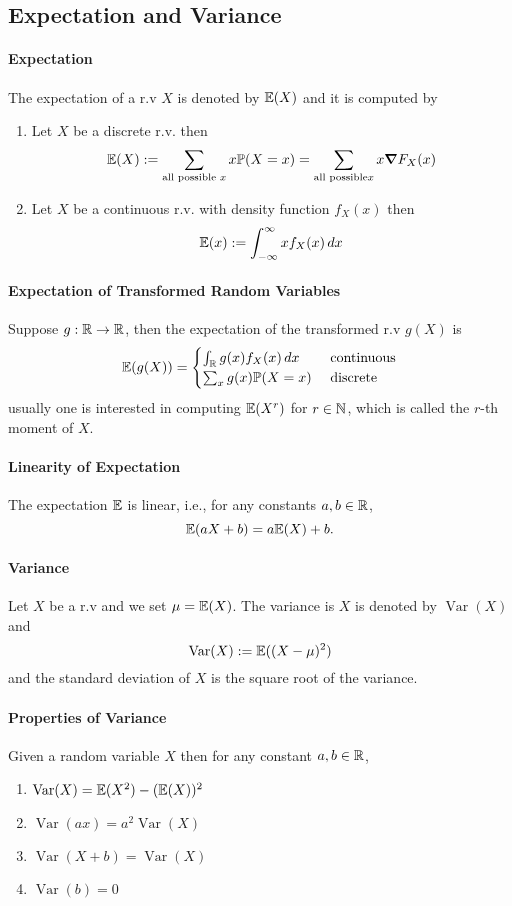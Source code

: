 \subsection{Expectation and Variance}
\paragraph{Expectation}
The expectation of a r.v \(X\) is denoted by \(\mathbb{E}(X)\) and it is computed by 
\begin{enumerate}
    \item Let \(X\) be a discrete r.v. then 
    \[\mathbb{E}(X) := \sum_{\text{all possible } x} x\mathbb{P}(X = x) = \sum_{\text{all possible} x} x\grad F_X(x)\]
    \item Let \(X\) be a continuous r.v. with density function \(f_X(x)\) then
    \[\mathbb{E}(x) := \int_{-\infty}^\infty xf_X(x) \, dx\]
\end{enumerate}

\paragraph{Expectation of Transformed Random Variables}
Suppose \(g: \mathbb{R} \to \mathbb{R}\), then the expectation of the transformed r.v \(g(X)\) is 
\[\mathbb{E}(g(X)) = \begin{cases}
    \int_{\mathbb{R}} g(x)f_X(x) \, dx & \text{ continuous} \\
    \sum_x g(x)\mathbb{P}(X = x) & \text{ discrete}
\end{cases}
\]
usually one is interested in computing \(\mathbb{E}(X^r)\) for \(r \in \mathbb{N}\), which is called the \(r\)-th moment of \(X\).

\paragraph{Linearity of Expectation}
The expectation \(\mathbb{E}\) is linear, i.e., for any constants \(a,b \in \mathbb{R}\),
\[\mathbb{E}(aX + b) = a\mathbb{E}(X) + b.\]

\paragraph{Variance}
Let \(X\) be a r.v and we set \(\mu = \mathbb{E}(X)\). The variance is \(X\) is denoted by \(\operatorname{Var}(X)\) and 
\[\operatorname{Var}(X) := \mathbb{E}((X - \mu)^2)\]
and the standard deviation of \(X\) is the square root of the variance.

\paragraph{Properties of Variance}
Given a random variable \(X\) then for any constant \(a,b \in \mathbb{R}\),
\begin{enumerate}
    \item \(\operatorname{Var}(X) = \mathbb{E}(X^2) - (\mathbb{E}(X))^2\)
    \item \(\operatorname{Var}(ax) = a^2\operatorname{Var}(X)\)
    \item \(\operatorname{Var}(X + b) = \operatorname{Var}(X)\)
    \item \(\operatorname{Var}(b) = 0\)
\end{enumerate}

